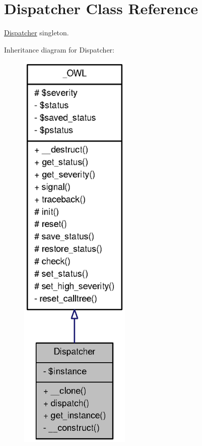 \section{Dispatcher Class Reference}
\label{classDispatcher}


\hyperlink{classDispatcher}{Dispatcher} singleton.  




Inheritance diagram for Dispatcher:\nopagebreak
\begin{figure}[H]
\begin{center}
\leavevmode
\includegraphics[width=150pt]{classDispatcher__inherit__graph}
\end{center}
\end{figure}


